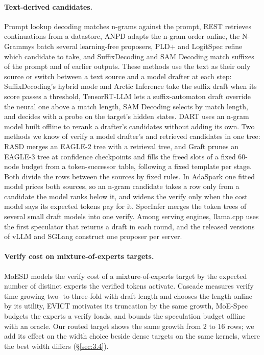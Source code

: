 \documentclass[10pt,twocolumn,letterpaper]{article}
\begin{document}
\paragraph{Text-derived candidates.} Prompt lookup decoding \cite{saxena2023prompt} matches n-grams against the prompt, REST \cite{he2024rest} retrieves continuations from a datastore, ANPD \cite{ou2024lossless} adapts the n-gram order online, the N-Grammys \cite{stewart2024n} batch several learning-free proposers, PLD+ \cite{somasundaram2025pld} and LogitSpec \cite{liu2026logitspec} refine which candidate to take, and SuffixDecoding \cite{oliaro2025suffixdecoding} and SAM Decoding \cite{hu2025sam} match suffixes of the prompt and of earlier outputs. These methods use the text as their only source or switch between a text source and a model drafter at each step: SuffixDecoding's hybrid mode and Arctic Inference \cite{snowflakendarctic} take the suffix draft when its score passes a threshold, TensorRT-LLM \cite{nvidiandtensorrt} lets a suffix-automaton draft override the neural one above a match length, SAM Decoding selects by match length, and \cite{eisenstadt2026copy} decides with a probe on the target's hidden states. DART \cite{liu2026dart} uses an n-gram model built offline to rerank a drafter's candidates without adding its own. Two methods we know of verify a model drafter's and retrieved candidates in one tree: RASD \cite{quan2025rasd} merges an EAGLE-2 tree with a retrieval tree, and Graft \cite{shen2026draft} prunes an EAGLE-3 tree at confidence checkpoints and fills the freed slots of a fixed 60-node budget from a token-successor table, following a fixed template per stage. Both divide the rows between the sources by fixed rules. In AdaSpark one fitted model prices both sources, so an n-gram candidate takes a row only from a candidate the model ranks below it, and widens the verify only when the cost model says its expected tokens pay for it. SpecInfer \cite{miao2024specinfer} merges the token trees of several small draft models into one verify. Among serving engines, llama.cpp uses the first speculator that returns a draft in each round, and the released versions of vLLM and SGLang construct one proposer per server.

\paragraph{Verify cost on mixture-of-experts targets.} MoESD \cite{huang2025moesd} models the verify cost of a mixture-of-experts target by the expected number of distinct experts the verified tokens activate. Cascade \cite{saxena2025utility} measures verify time growing two- to three-fold with draft length and chooses the length online by its utility, EVICT \cite{pan2026making} motivates its truncation by the same growth, MoE-Spec \cite{mcdanel2026moe} budgets the experts a verify loads, and \cite{amankulov2026limits} bounds the speculation budget offline with an oracle. Our routed target shows the same growth from 2 to 16 rows; we add its effect on the width choice beside dense targets on the same kernels, where the best width differs (\S\ref{sec:3.4}).
\end{document}
